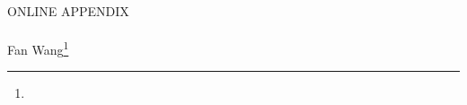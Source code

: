 \documentclass[12pt,english]{article}
\begin{document}
\appendix
\begin{refsection}

\setcounter{page}{1}

\renewcommand*{\thefootnote}{\fnsymbol{footnote}}
\begingroup
  \doublespacing
  \centering
  \Large ONLINE APPENDIX \\[1.5em]
  \LARGE \PAPERTITLE \\[0.75em]
  \large
    Fan Wang\footnote[1]{\AUTHORWANGINFO}\\[1.0em]
\endgroup
\clearpage



\begingroup
{}
\setlength\bibitemsep{0pt}
\printbibliography[title=References for Online Appendix]
\endgroup
\pagebreak
\end{refsection}
\end{document}
